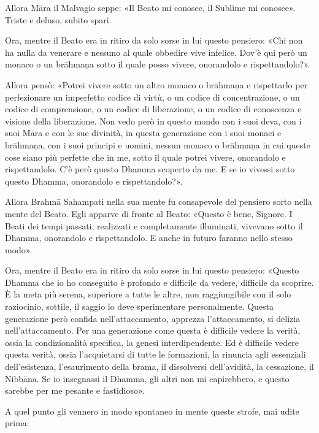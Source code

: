 Allora Māra il Malvagio seppe: «Il Beato mi conosce, il Sublime mi
conosce». Triste e deluso, subito sparì.




Ora, mentre il Beato era in ritiro da solo sorse in lui questo pensiero:
«Chi non ha nulla da venerare e nessuno al quale obbedire vive infelice.
Dov’è qui però un monaco o un brāhmaṇa sotto il quale posso vivere,
onorandolo e rispettandolo?».


Allora pensò: «Potrei vivere sotto un altro monaco o brāhmaṇa e
rispettarlo per perfezionare un imperfetto codice di virtù, o un codice
di concentrazione, o un codice di comprensione, o un codice di
liberazione, o un codice di conoscenza e visione della liberazione. Non
vedo però in questo mondo con i suoi deva, con i suoi Māra e con le sue
divinità, in questa generazione con i suoi monaci e brāhmaṇa, con i suoi
principi e uomini, nessun monaco o brāhmaṇa in cui queste cose siano più
perfette che in me, sotto il quale potrei vivere, onorandolo e
rispettandolo. C’è però questo Dhamma scoperto da me. E se io vivessi
sotto questo Dhamma, onorandolo e rispettandolo?».


Allora Brahmā Sahampati nella sua mente fu consapevole del pensiero
sorto nella mente del Beato. Egli apparve di fronte al Beato: «Questo è
bene, Signore. I Beati dei tempi passati, realizzati e completamente
illuminati, vivevano sotto il Dhamma, onorandolo e rispettandolo. E
anche in futuro faranno nello stesso modo».




 Ora, mentre il Beato era in ritiro da solo sorse in lui
questo pensiero: «Questo Dhamma che io ho conseguito è profondo e
difficile da vedere, difficile da scoprire. È la meta più serena,
superiore a tutte le altre, non raggiungibile con il solo raziocinio,
sottile, il saggio lo deve sperimentare personalmente. Questa
generazione però confida nell’attaccamento, apprezza l’attaccamento, si
delizia nell’attaccamento. Per una generazione come questa è difficile
vedere la verità, ossia la condizionalità specifica, la genesi
interdipendente. Ed è difficile vedere questa verità, ossia
l’acquietarsi di tutte le formazioni, la rinuncia agli essenziali
dell’esistenza, l’esaurimento della brama, il dissolversi dell’avidità,
la cessazione, il Nibbāna. Se io insegnassi il Dhamma, gli altri non mi
capirebbero, e questo sarebbe per me pesante e fastidioso».


A quel punto gli vennero in modo spontaneo in mente queste strofe, mai
udite prima:


